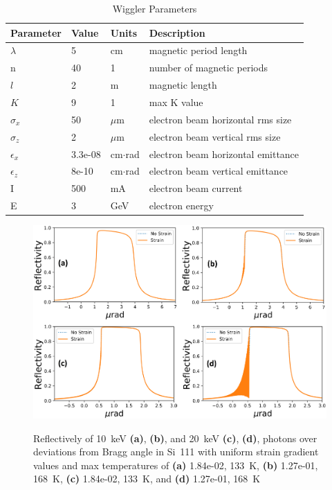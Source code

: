 \documentclass[preprint]{iucr}              %
\begin{document}
\begin{table}\label{ivwbalder}
\caption{Wiggler Parameters}
\begin{tabular}{@{}llll@{}}
Parameter       & Value         & Units     & Description                           \\
\hline
$\lambda$       & 5             & cm        & magnetic period length                \\
n               & 40            & 1         & number of magnetic periods            \\ 
$l$             & 2             & m         & magnetic length                       \\
$K$             & 9             & 1         & max K value                           \\
$\sigma_x$      & 50            & $\mu$m    & electron beam horizontal rms size     \\
$\sigma_z$      & 2             & $\mu$m    & electron beam vertical rms size       \\
$\epsilon_x$    & 3.3e-08       & cm$\cdot$rad    & electron beam horizontal emittance    \\
$\epsilon_z$    & 8e-10         & cm$\cdot$rad    & electron beam vertical emittance      \\
I               & 500           & mA        & electron beam current                 \\
E               & 3             & GeV       & electron energy                       \\
\end{tabular}
\end{table}


\begin{figure}
\caption{Reflectively of 10~keV \textbf{(a)}, \textbf{(b)}, and 20~keV \textbf{(c)}, \textbf{(d)}, photons over deviations from Bragg angle in Si~111 with uniform strain gradient values and max temperatures of \textbf{(a)} 1.84e-02, 133~K, \textbf{(b)}  1.27e-01, 168~K, \textbf{(c)} 1.84e-02, 133~K, and \textbf{(d)}  1.27e-01, 168~K}
\includegraphics[width =\textwidth]{images/111USG.png}
\label{fig:111USG}
\end{figure}
\end{document}
